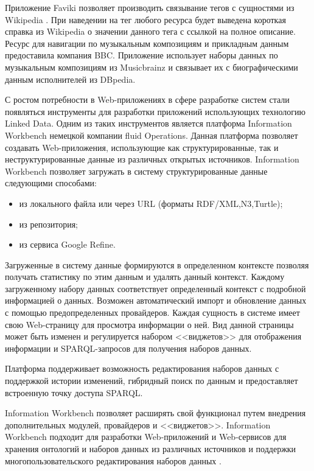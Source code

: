 Приложение Faviki позволяет производить связывание тегов с сущностями из Wikipedia \cite{hausenblas2009exploiting}. При наведении на тег любого ресурса будет выведена короткая справка из Wikipedia о значении данного тега с ссылкой на полное описание.  Ресурс для навигации по музыкальным композициям и прикладным данным предоставила компания BBC. Приложение использует наборы данных по музыкальным композициям из Musicbrainz и связывает их с биографическими данным исполнителей из DBpedia. 

С ростом потребности в Web-приложениях в сфере разработке систем стали появляться инструменты для разработки приложений использующих технологию Linked Data. Одним из таких инструментов является платформа Information Workbench \cite{haase2009information} немецкой компании fluid Operations. Данная платформа позволяет создавать Web-приложения, использующие как структурированные, так и неструктурированные данные из различных открытых источников. Information Workbench позволяет загружать в систему структурированные данные следующими способами:

\begin{itemize}
\item из локального файла или через URL (форматы RDF/XML,N3,Turtle);
\item из репозитория;
\item из сервиса Google Refine.
\end{itemize}

Загруженные в систему данные формируются в определенном контексте позволяя получать статистику по этим данным и удалять данный контекст. Каждому загруженному набору данных соответствует определенный контекст с подробной информацией о данных. Возможен автоматический импорт и обновление данных с помощью предопределенных провайдеров.
Каждая сущность в системе имеет свою Web-страницу для просмотра информации о ней. Вид данной страницы может быть изменен и регулируется набором <<виджетов>> для отображения информации и SPARQL-запросов для получения наборов данных.

Платформа поддерживает возможность редактирования наборов данных с поддержкой истории изменений, гибридный поиск по данным и предоставляет встроенную точку доступа SPARQL. 

Information Workbench позволяет расширять свой функционал путем внедрения дополнительных  модулей, провайдеров и <<виджетов>>. Information Workbench подходит для разработки Web-приложений и Web-сервисов для хранения онтологий и наборов данных из различных источников и поддержки многопользовательского редактирования наборов данных \cite{hse2011info}. 



